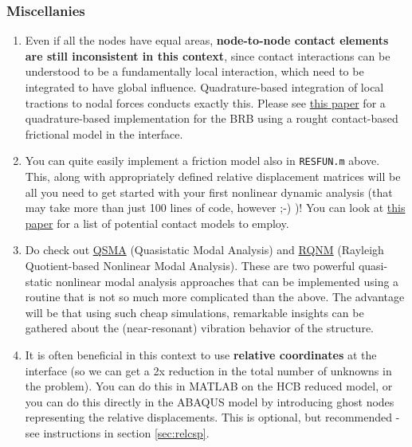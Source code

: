\documentclass[11pt]{article}
\begin{document}
\subsubsection{Miscellanies}
\label{sec:org96ba972}
\begin{enumerate}
\item Even if all the nodes have equal areas, \textbf{node-to-node contact elements are still inconsistent in this context}, since contact interactions can be understood to be a fundamentally local interaction, which need to be integrated to have global influence.
Quadrature-based integration of local tractions to nodal forces conducts exactly this.
Please see \href{https://www.sciencedirect.com/science/article/abs/pii/S0888327020300017}{this paper} for a quadrature-based implementation for the BRB using a rought contact-based frictional model in the interface.
\item You can quite easily implement a friction model also in \texttt{RESFUN.m} above.
This, along with appropriately defined relative displacement matrices will be all you need to get started with your first nonlinear dynamic analysis (that may take more than just 100 lines of code, however ;-) )!
You can look at \href{https://asmedigitalcollection.asme.org/appliedmechanicsreviews/article/72/4/040802/1084997/A-Review-of-Damping-Models-for-Structures-With?casa\_token=JWwE4Nf3808AAAAA:266N8zS75p4KrKsaZLrVHrnMfOSyZoq3urnmMf1QbWvJbDrWQYw6FJcpYFmffulGetIYTnMAlA}{this paper} for a list of potential contact models to employ.
\item Do check out \href{https://www.sciencedirect.com/science/article/abs/pii/S0888327018305739}{QSMA} (Quasistatic Modal Analysis) and \href{https://www.sciencedirect.com/science/article/abs/pii/S0045794919315160}{RQNM} (Rayleigh Quotient-based Nonlinear Modal Analysis).
These are two powerful quasi-static nonlinear modal analysis approaches that can be implemented using a routine that is not so much more complicated than the above.
The advantage will be that using such cheap simulations, remarkable insights can be gathered about the (near-resonant) vibration behavior of the structure.
\item It is often beneficial in this context to use \textbf{relative coordinates} at the interface (so we can get a 2x reduction in the total number of unknowns in the problem). 
You can do this in MATLAB on the HCB reduced model, or you can do this directly in the ABAQUS model by introducing ghost nodes representing the relative displacements.
This is optional, but recommended - see instructions in section \ref{sec:relcsp}.
\end{enumerate}
\pagebreak
\end{document}
